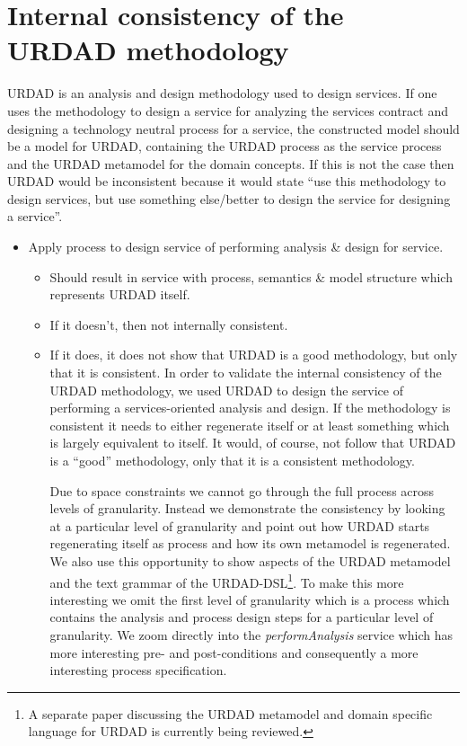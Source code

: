 \section{Internal consistency of the URDAD methodology}
\label{sec:urdadConsistency}

URDAD is an analysis and design methodology used to design services. If one uses the methodology to design a service for analyzing the services contract and designing a technology neutral process for a service, the constructed model should be a model for URDAD, containing the URDAD process as the service process and the URDAD metamodel for the domain concepts. If this is not the case then URDAD would be inconsistent because it would state ``use this methodology to design services, but use something else/better to design the service for designing a service''.
      \begin{itemize}
		  \item Apply process to design service of performing analysis \& design for service.
			 \begin{itemize}
				\item Should result in service with process, semantics \& model structure which represents URDAD itself.
				\item If it doesn't, then not internally consistent.
            \item If it does, it does not show that URDAD is a good methodology, but only that it is consistent.
In order to validate the internal consistency of the URDAD methodology, we used URDAD to design the service of performing a services-oriented analysis and design. If the methodology is consistent it needs to either regenerate itself or at least something which is largely equivalent to itself. It would, of course, not follow that URDAD is a ``good'' methodology, only that it is a consistent methodology.

Due to space constraints we cannot go through the full process across levels of granularity. Instead we demonstrate the consistency by looking at a particular level of granularity and point out how URDAD starts regenerating itself as process and how its own metamodel is regenerated. We also use this opportunity to show aspects of the URDAD metamodel and the text grammar of the URDAD-DSL\footnote{A separate paper discussing the URDAD metamodel and domain specific language for URDAD is currently being reviewed.}. To make this more interesting we omit the first level of granularity which is a process which contains the analysis and process design steps for a particular level of granularity. We zoom directly into the \emph{performAnalysis} service which has more interesting pre- and post-conditions and consequently a more interesting process specification.


\end{itemize}
\end{itemize}

